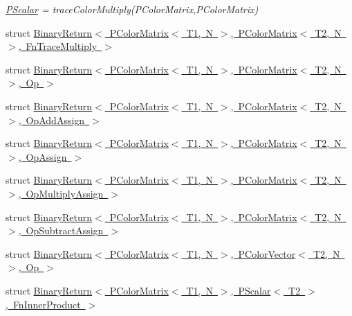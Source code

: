 \begin{DoxyCompactItemize}
\begin{DoxyCompactList}\small\item\em \mbox{\hyperlink{classENSEM_1_1PScalar}{P\+Scalar}} = trace\+Color\+Multiply(\+P\+Color\+Matrix,\+P\+Color\+Matrix) \end{DoxyCompactList}\item 
struct \mbox{\hyperlink{structENSEM_1_1BinaryReturn_3_01PColorMatrix_3_01T1_00_01N_01_4_00_01PColorMatrix_3_01T2_00_01N_01_4_00_01FnTraceMultiply_01_4}{Binary\+Return$<$ P\+Color\+Matrix$<$ T1, N $>$, P\+Color\+Matrix$<$ T2, N $>$, Fn\+Trace\+Multiply $>$}}
\item 
struct \mbox{\hyperlink{structENSEM_1_1BinaryReturn_3_01PColorMatrix_3_01T1_00_01N_01_4_00_01PColorMatrix_3_01T2_00_01N_01_4_00_01Op_01_4}{Binary\+Return$<$ P\+Color\+Matrix$<$ T1, N $>$, P\+Color\+Matrix$<$ T2, N $>$, Op $>$}}
\item 
struct \mbox{\hyperlink{structENSEM_1_1BinaryReturn_3_01PColorMatrix_3_01T1_00_01N_01_4_00_01PColorMatrix_3_01T2_00_01N_01_4_00_01OpAddAssign_01_4}{Binary\+Return$<$ P\+Color\+Matrix$<$ T1, N $>$, P\+Color\+Matrix$<$ T2, N $>$, Op\+Add\+Assign $>$}}
\item 
struct \mbox{\hyperlink{structENSEM_1_1BinaryReturn_3_01PColorMatrix_3_01T1_00_01N_01_4_00_01PColorMatrix_3_01T2_00_01N_01_4_00_01OpAssign_01_4}{Binary\+Return$<$ P\+Color\+Matrix$<$ T1, N $>$, P\+Color\+Matrix$<$ T2, N $>$, Op\+Assign $>$}}
\item 
struct \mbox{\hyperlink{structENSEM_1_1BinaryReturn_3_01PColorMatrix_3_01T1_00_01N_01_4_00_01PColorMatrix_3_01T2_00_01N_01_4_00_01OpMultiplyAssign_01_4}{Binary\+Return$<$ P\+Color\+Matrix$<$ T1, N $>$, P\+Color\+Matrix$<$ T2, N $>$, Op\+Multiply\+Assign $>$}}
\item 
struct \mbox{\hyperlink{structENSEM_1_1BinaryReturn_3_01PColorMatrix_3_01T1_00_01N_01_4_00_01PColorMatrix_3_01T2_00_01N_01_4_00_01OpSubtractAssign_01_4}{Binary\+Return$<$ P\+Color\+Matrix$<$ T1, N $>$, P\+Color\+Matrix$<$ T2, N $>$, Op\+Subtract\+Assign $>$}}
\item 
struct \mbox{\hyperlink{structENSEM_1_1BinaryReturn_3_01PColorMatrix_3_01T1_00_01N_01_4_00_01PColorVector_3_01T2_00_01N_01_4_00_01Op_01_4}{Binary\+Return$<$ P\+Color\+Matrix$<$ T1, N $>$, P\+Color\+Vector$<$ T2, N $>$, Op $>$}}
\item 
struct \mbox{\hyperlink{structENSEM_1_1BinaryReturn_3_01PColorMatrix_3_01T1_00_01N_01_4_00_01PScalar_3_01T2_01_4_00_01FnInnerProduct_01_4}{Binary\+Return$<$ P\+Color\+Matrix$<$ T1, N $>$, P\+Scalar$<$ T2 $>$, Fn\+Inner\+Product $>$}}

\end{DoxyCompactItemize}
